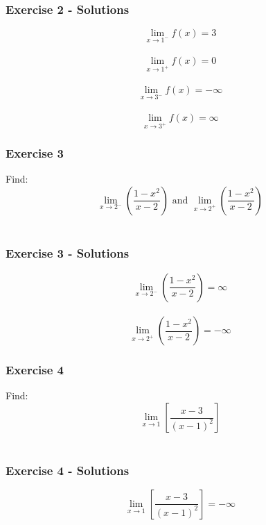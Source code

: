 \documentclass[12pt]{beamer}
\begin{document}
\begin{frame}
	\frametitle{Exercise 2 - Solutions}
	\Large
	\[\displaystyle\lim_{x\to1^{-}}f(x) = 3\]\\
	\[\displaystyle\lim_{x\to1^{+}}f(x) = 0\]\\
	\[\displaystyle\lim_{x\to3^{-}}f(x) = -\infty\]\\
	\[\displaystyle\lim_{x\to3^{+}}f(x) = \infty\]
\end{frame}
\begin{frame}
	\frametitle{Exercise 3}
	\vspace*{\fill}
	\vspace*{\fill}
	\vspace*{\fill}
	\vspace*{\fill}
	\vspace*{\fill}
	\initclock
	\Large
	Find: \[\displaystyle\lim_{x\to2^{-}}\left(\frac{1-x^2}{x-2}\right) \text{ and } \displaystyle\lim_{x\to2^{+}}\left(\frac{1-x^2}{x-2}\right)\]\\
	\vspace*{\fill}
	\vspace*{\fill}
	\vspace*{\fill}
	\vspace*{\fill}
	\vspace*{\fill}
	\crono
\end{frame}
\begin{frame}
	\frametitle{Exercise 3 - Solutions}
	\Large
	\[\displaystyle\lim_{x\to2^{-}}\left(\frac{1-x^2}{x-2}\right) = \infty\]\\
	\[\displaystyle\lim_{x\to2^{+}}\left(\frac{1-x^2}{x-2}\right) = -\infty\]
\end{frame}
\begin{frame}
	\frametitle{Exercise 4}
	\vspace*{\fill}
	\vspace*{\fill}
	\vspace*{\fill}
	\vspace*{\fill}
	\vspace*{\fill}
	\initclock
	\Large
	Find: \[\displaystyle\lim_{x\to1}\left[\frac{x-3}{(x-1)^2}\right]\]\\
	\vspace*{\fill}
	\vspace*{\fill}
	\vspace*{\fill}
	\vspace*{\fill}
	\vspace*{\fill}
	\crono
\end{frame}
\begin{frame}
	\frametitle{Exercise 4 - Solutions}
	\Large
	\[\displaystyle\lim_{x\to1}\left[\frac{x-3}{(x-1)^2}\right] = -\infty\]
\end{frame}
\end{document}
